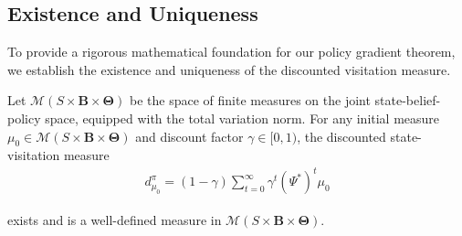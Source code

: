 \subsection{Existence and Uniqueness}
To provide a rigorous mathematical foundation for our policy gradient theorem,
we establish the existence and uniqueness of the discounted visitation measure.
\begin{lemma}
    Let $\mathcal{M}(S \times \boldsymbol{B}\times \boldsymbol{\Theta})$ be the space
    of finite measures on the joint state-belief-policy space, equipped with the
    total variation norm. For any initial measure $\mu_{0} \in \mathcal{M}(S \times
        \boldsymbol{B}\times \boldsymbol{\Theta})$ and discount factor $\gamma \in [0,1
        )$, the discounted state-visitation measure
    \begin{align}
        d^{\pi}_{\mu_0}= (1-\gamma) \sum_{t=0}^{\infty}\gamma^{t} (\Psi^{*})^{t} \mu_{0}
    \end{align}

    exists and is a well-defined measure in $\mathcal{M}(S \times \boldsymbol{B}\times
        \boldsymbol{\Theta})$.
\end{lemma}
